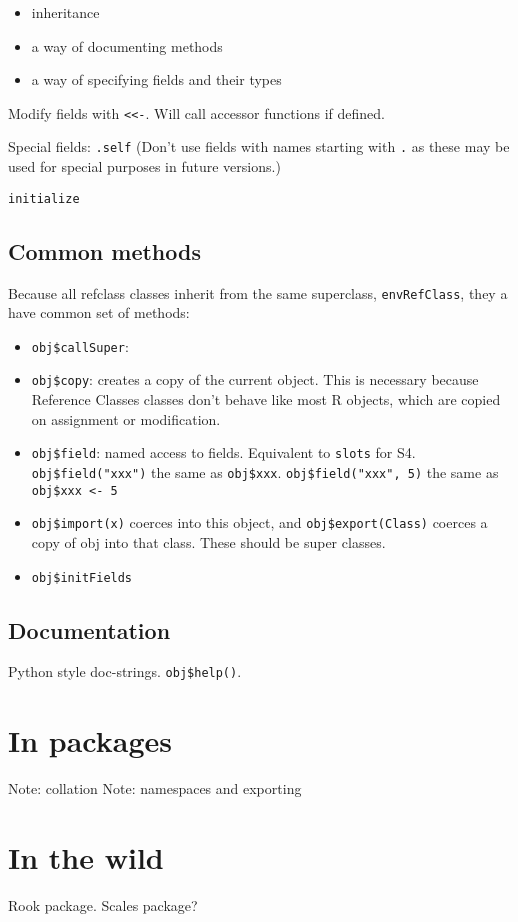 \begin{itemize}
\tightlist
\item
  inheritance
\item
  a way of documenting methods
\item
  a way of specifying fields and their types
\end{itemize}

Modify fields with \texttt{\textless{}\textless{}-}. Will call accessor
functions if defined.

Special fields: \texttt{.self} (Don't use fields with names starting
with \texttt{.} as these may be used for special purposes in future
versions.)

\texttt{initialize}

\hypertarget{common-methods}{%
\subsection{Common methods}\label{common-methods}}

Because all refclass classes inherit from the same superclass,
\texttt{envRefClass}, they a have common set of methods:

\begin{itemize}
\item
  \texttt{obj\$callSuper}:
\item
  \texttt{obj\$copy}: creates a copy of the current object. This is
  necessary because Reference Classes classes don't behave like most R
  objects, which are copied on assignment or modification.
\item
  \texttt{obj\$field}: named access to fields. Equivalent to
  \texttt{slots} for S4. \texttt{obj\$field("xxx")} the same as
  \texttt{obj\$xxx}. \texttt{obj\$field("xxx",\ 5)} the same as
  \texttt{obj\$xxx\ \textless{}-\ 5}
\item
  \texttt{obj\$import(x)} coerces into this object, and
  \texttt{obj\$export(Class)} coerces a copy of obj into that class.
  These should be super classes.
\item
  \texttt{obj\$initFields}
\end{itemize}

\hypertarget{documentation}{%
\subsection{Documentation}\label{documentation}}

Python style doc-strings. \texttt{obj\$help()}.

\hypertarget{in-packages}{%
\section{In packages}\label{in-packages}}

Note: collation Note: namespaces and exporting

\hypertarget{in-the-wild}{%
\section{In the wild}\label{in-the-wild}}

Rook package. Scales package?

